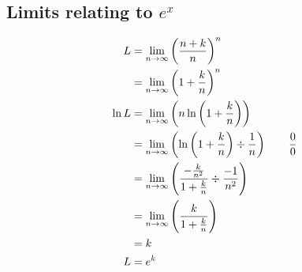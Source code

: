 \documentclass[a4paper]{article}
\begin{document}
\begin{multicols*}{3}
    \subsection*{Limits relating to $e^x$}
      \begin{align*}
        L &= \lim_{n \rightarrow \infty} \left(\dfrac{n+k}{n}\right)^n \\
          &= \lim_{n \rightarrow \infty} \left(1 + \dfrac{k}{n}\right)^n \\
        \ln L &= \lim_{n \rightarrow \infty} \left( n \ln \left(1 + \dfrac{k}{n}\right) \right) \\
              &= \lim_{n \rightarrow \infty} \left( \ln \left(1 + \dfrac{k}{n}\right) \div \dfrac{1}{n} \right) \quad\quad \dfrac{0}{0} \\
              &= \lim_{n \rightarrow \infty} \left(  \dfrac{-\tfrac{k}{n^2}}{1+\tfrac{k}{n}} \div \dfrac{-1}{n^2}  \right) \\
              &= \lim_{n \rightarrow \infty} \left(  \dfrac{k}{1+\tfrac{k}{n}}  \right) \\
              &= k \\
            L &= e^k
      \end{align*}
\end{multicols*}
\end{document}
